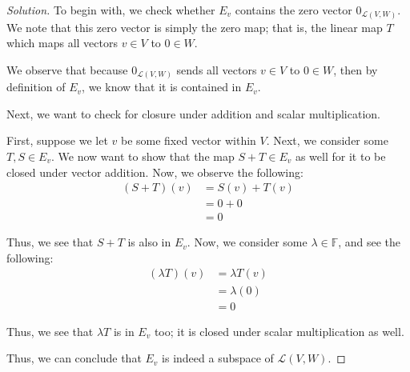 \documentclass{article}
\newenvironment{solution}{\begin{proof}[Solution]}{\end{proof}}
\begin{document}
	\begin{solution}
		To begin with, we check whether $E_{v}$ contains the zero vector $0_{\mathcal L(V,W)}$. We note that this zero vector is simply the zero map; that is, the linear map $T$ which maps all vectors $v \in V$ to $0 \in W$.
		
		We observe that because $0_{\mathcal L(V,W)}$ sends all vectors $v \in V$ to $0 \in W$, then by definition of $E_{v}$, we know that it is contained in $E_{v}$.
		
		Next, we want to check for closure under addition and scalar multiplication.
		
		First, suppose we let $v$ be some fixed vector within $V$. Next, we consider some $T, S \in E_{v}$. We now want to show that the map $S+T \in E_{v}$ as well for it to be closed under vector addition. Now, we observe the following:
		\begin{align*}
			(S+T)(v) &= S(v) + T(v) \\
			&= 0 + 0 \\
			&= 0
		\end{align*}
	
		Thus, we see that $S+T$ is also in $E_{v}$. Now, we consider some $\lambda \in \mathbb{F}$, and see the following:
		\begin{align*}
			(\lambda T)( v) &= \lambda T(v) \\
			&= \lambda (0) \\
			&= 0
		\end{align*}
	
		Thus, we see that $\lambda T$ is in $E_{v}$ too; it is closed under scalar multiplication as well. 
		
		Thus, we can conclude that $E_{v}$ is indeed a subspace of $\mathcal L(V,W)$.
	\end{solution}
\end{document}

